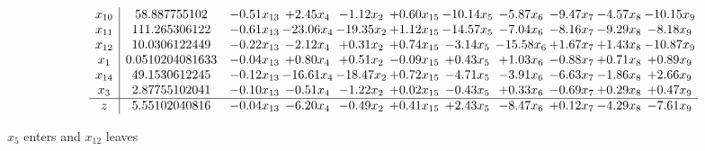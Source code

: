 \documentclass[9pt]{article}
\begin{document}
 \[\begin{array}{c| c c@{\hskip 2pt} c@{\hskip 2pt} c@{\hskip 2pt} c@{\hskip 2pt} c@{\hskip 2pt} c@{\hskip 2pt} c@{\hskip 2pt} c@{\hskip 2pt} c@{\hskip 2pt} }
 x_{10}   &  58.887755102 & -0.51 x_{13} & +  2.45 x_{4} & -1.12 x_{2} & +  0.60 x_{15} & -10.14 x_{5} & -5.87 x_{6} & -9.47 x_{7} & -4.57 x_{8} & -10.15 x_{9}\\
 x_{11}   &  111.265306122 & -0.61 x_{13} & -23.06 x_{4} & -19.35 x_{2} & +  1.12 x_{15} & -14.57 x_{5} & -7.04 x_{6} & -8.16 x_{7} & -9.29 x_{8} & -8.18 x_{9}\\
 x_{12}   &  10.0306122449 & -0.22 x_{13} & -2.12 x_{4} & +  0.31 x_{2} & +  0.74 x_{15} & -3.14 x_{5} & -15.58 x_{6} & +  1.67 x_{7} & +  1.43 x_{8} & -10.87 x_{9}\\
 x_{1}   &  0.0510204081633 & -0.04 x_{13} & +  0.80 x_{4} & +  0.51 x_{2} & -0.09 x_{15} & +  0.43 x_{5} & +  1.03 x_{6} & -0.88 x_{7} & +  0.71 x_{8} & +  0.89 x_{9}\\
 x_{14}   &  49.1530612245 & -0.12 x_{13} & -16.61 x_{4} & -18.47 x_{2} & +  0.72 x_{15} & -4.71 x_{5} & -3.91 x_{6} & -6.63 x_{7} & -1.86 x_{8} & +  2.66 x_{9}\\
 x_{3}   &  2.87755102041 & -0.10 x_{13} & -0.51 x_{4} & -1.22 x_{2} & +  0.02 x_{15} & -0.43 x_{5} & +  0.33 x_{6} & -0.69 x_{7} & +  0.29 x_{8} & +  0.47 x_{9}\\
\hline
z    &  5.55102040816 & -0.04 x_{13} & -6.20 x_{4} & -0.49 x_{2} & +  0.41 x_{15} & +  2.43 x_{5} & -8.47 x_{6} & +  0.12 x_{7} & -4.29 x_{8} & -7.61 x_{9}\\
\end{array}\]


 $ x_{5} $ enters and $ x_{12} $ leaves 
\end{document}
